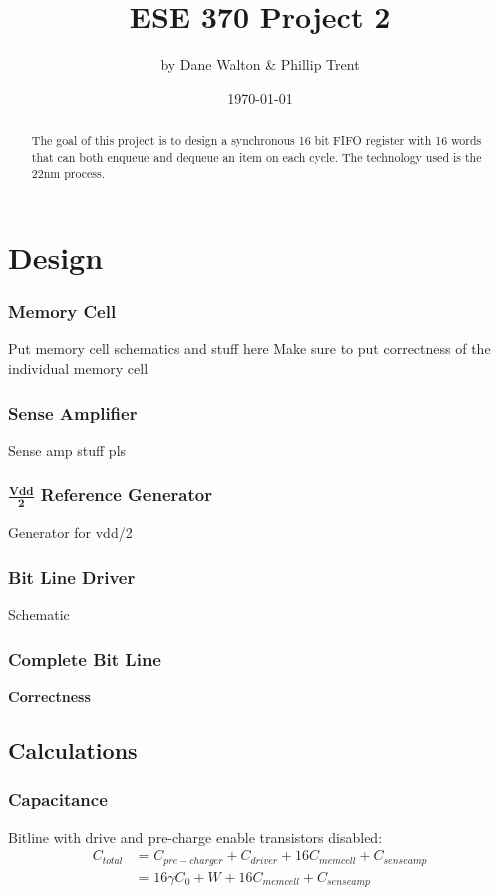 \documentclass[a4paper]{article}
\title{ESE 370 Project 2}
\author{by Dane Walton \& Phillip Trent}
\date{\today}
\begin{document}
\maketitle

\begin{abstract}
The goal of this project is to design a synchronous 16 bit FIFO register with 16 words that can both enqueue and dequeue an item on each cycle. The technology used is the 22nm process.
\end{abstract}

\section{Design}
\label{sec:design}
\subsubsection{Memory Cell}
Put memory cell schematics and stuff here
Make sure to put correctness of the individual memory cell
\subsubsection{Sense Amplifier}
Sense amp stuff pls
\subsubsection{$\frac{\textbf{Vdd}}{\textbf{2}}$ Reference Generator}
Generator for vdd/2
\subsubsection{Bit Line Driver}
Schematic
\subsubsection{Complete Bit Line}
\textbf{Correctness}

\subsection{Calculations}
\subsubsection{Capacitance}
Bitline with drive and pre-charge enable transistors disabled:
\begin{align*}
C_{total} &= C_{pre-charger} + C_{driver} + 16 C_{memcell} + C_{senseamp}\\
&= 16 \gamma C_0 + W_{} + 16 C_{memcell} + C_{senseamp}
\end{align*}
\end{document}
